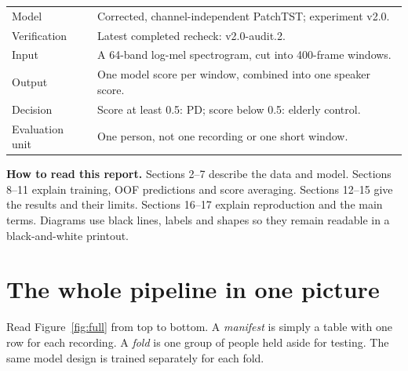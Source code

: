 \documentclass[11pt,a4paper]{article}
\newcommand{\key}[1]{\textbf{#1}}
\begin{document}
\begin{center}
\begin{tabularx}{\linewidth}{@{}L{3.3cm}Y@{}}
\toprule
Model & Corrected, channel-independent PatchTST; experiment v2.0.\\
Verification & Latest completed recheck: v2.0-audit.2.\\
Input & A 64-band log-mel spectrogram, cut into 400-frame windows.\\
Output & One model score per window, combined into one speaker score.\\
Decision & Score at least 0.5: PD; score below 0.5: elderly control.\\
Evaluation unit & One person, not one recording or one short window.\\
\bottomrule
\end{tabularx}
\end{center}

\key{How to read this report.} Sections 2--7 describe the data and model.
Sections 8--11 explain training, OOF predictions and score averaging.
Sections 12--15 give the results and their limits. Sections 16--17 explain
reproduction and the main terms. Diagrams use black lines, labels and shapes so
they remain readable in a black-and-white printout.

\clearpage
\section{The whole pipeline in one picture}
Read Figure~\ref{fig:full} from top to bottom. A \emph{manifest} is simply a table
with one row for each recording. A \emph{fold} is one group of people held aside
for testing. The same model design is trained separately for each fold.
\end{document}
